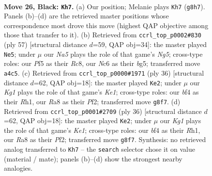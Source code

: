 \documentclass[11pt]{article}
\begin{document}
\clearpage

\begin{figure}[p]\centering
\begin{subfigure}{0.46\textwidth}\centering
\resizebox{\linewidth}{!}{%
\newchessgame
\chessboard[
  setfen={r1b3kr/8/p1n1N1p1/p3Pp1p/n1B2B2/P5P1/1P3P1P/RK1R4 b - - 0 26},
  showmover=false,
  pgfstyle=straightmove, color=movearrow, markmove={g8-h7}
]}
\caption{}
\end{subfigure}\hfill
\begin{subfigure}{0.46\textwidth}\centering
\resizebox{\linewidth}{!}{%
\newchessgame
\chessboard[
  setfen={2r1r1k1/5pp1/p3p1p1/Pp1n2B1/1b4nP/1N4P1/1P2PPB1/1R1R2K1 b - - 15 29},
  showmover=false,
  pgfstyle=straightmove, color=movearrow, markmove={g4-e5}
]}
\caption{}
\end{subfigure}
\\[4pt]
\begin{subfigure}{0.46\textwidth}\centering
\resizebox{\linewidth}{!}{%
\newchessgame
\chessboard[
  setfen={2r1k2r/p3bppp/1p2pn2/4N3/3PPB2/P7/5PPP/R3K2R w KQ - 2 19},
  showmover=false,
  pgfstyle=straightmove, color=movearrow, markmove={e1-e2}
]}
\caption{}
\end{subfigure}\hfill
\begin{subfigure}{0.46\textwidth}\centering
\resizebox{\linewidth}{!}{%
\newchessgame
\chessboard[
  setfen={2r1k2r/p3bppp/1p2pn2/4N3/3PPB2/P7/5PPP/R3K2R w KQ - 2 19},
  showmover=false,
  pgfstyle=straightmove, color=movearrow, markmove={e1-e2}
]}
\caption{}
\end{subfigure}
\caption{\textbf{Move 26, Black: \texttt{Kh7}.} (a) Our position; Melanie plays \texttt{Kh7} (\texttt{g8h7}). Panels (b)--(d) are the retrieved master positions whose correspondence most drove this move (highest QAP objective among those that transfer to it). (b) Retrieved from \texttt{ccrl\_top\_p0002\#830} (ply 57) [structural distance $d$=59, QAP obj=34]: the master played \texttt{Ne5}; under $\mu$ our \emph{Na5} plays the role of that game's \emph{Ng5}; cross-type roles: our \emph{P}f5 as their \emph{R}c8, our \emph{N}c6 as their \emph{b}g5; transferred move \texttt{a4c5}. (c) Retrieved from \texttt{ccrl\_top\_p0000\#1971} (ply 36) [structural distance $d$=62, QAP obj=18]: the master played \texttt{Ke2}; under $\mu$ our \emph{Kg1} plays the role of that game's \emph{Ke1}; cross-type roles: our \emph{b}f4 as their \emph{R}h1, our \emph{R}a8 as their \emph{P}f2; transferred move \texttt{g8f7}. (d) Retrieved from \texttt{ccrl\_top\_p0001\#2709} (ply 36) [structural distance $d$=62, QAP obj=18]: the master played \texttt{Ke2}; under $\mu$ our \emph{Kg1} plays the role of that game's \emph{Ke1}; cross-type roles: our \emph{b}f4 as their \emph{R}h1, our \emph{R}a8 as their \emph{P}f2; transferred move \texttt{g8f7}. Synthesis: no retrieved analog transferred to \texttt{Kh7} -- the \texttt{search} selector chose it on value (material / mate); panels (b)--(d) show the strongest nearby analogies.}
\label{fig:thought-m51}
\end{figure}
\end{document}
